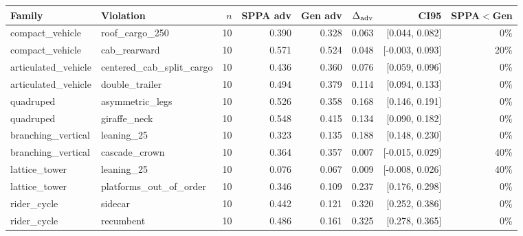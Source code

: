 \begin{tabular}{@{}llrrrrrr@{}}
\toprule
Family & Violation & $n$ & SPPA adv & Gen adv & $\Delta_{\rm adv}$ & CI95 & SPPA$<$Gen \\
\midrule
compact\_vehicle & roof\_cargo\_250 & 10 & 0.390 & 0.328 & 0.063 & [0.044, 0.082] & 0\% \\
compact\_vehicle & cab\_rearward & 10 & 0.571 & 0.524 & 0.048 & [-0.003, 0.093] & 20\% \\
articulated\_vehicle & centered\_cab\_split\_cargo & 10 & 0.436 & 0.360 & 0.076 & [0.059, 0.096] & 0\% \\
articulated\_vehicle & double\_trailer & 10 & 0.494 & 0.379 & 0.114 & [0.094, 0.133] & 0\% \\
quadruped & asymmetric\_legs & 10 & 0.526 & 0.358 & 0.168 & [0.146, 0.191] & 0\% \\
quadruped & giraffe\_neck & 10 & 0.548 & 0.415 & 0.134 & [0.090, 0.182] & 0\% \\
branching\_vertical & leaning\_25 & 10 & 0.323 & 0.135 & 0.188 & [0.148, 0.230] & 0\% \\
branching\_vertical & cascade\_crown & 10 & 0.364 & 0.357 & 0.007 & [-0.015, 0.029] & 40\% \\
lattice\_tower & leaning\_25 & 10 & 0.076 & 0.067 & 0.009 & [-0.008, 0.026] & 40\% \\
lattice\_tower & platforms\_out\_of\_order & 10 & 0.346 & 0.109 & 0.237 & [0.176, 0.298] & 0\% \\
rider\_cycle & sidecar & 10 & 0.442 & 0.121 & 0.320 & [0.252, 0.386] & 0\% \\
rider\_cycle & recumbent & 10 & 0.486 & 0.161 & 0.325 & [0.278, 0.365] & 0\% \\
\bottomrule
\end{tabular}
